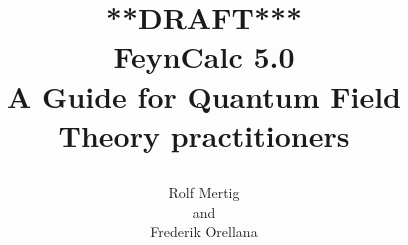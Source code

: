 \documentclass[11pt,a4paper]{report}
\begin{document}
\newcommand{\len}{0pt}
\newcommand{\ind}{\leftskip \len}
\newcommand{\mcode}[1]{
\parbox{0.8\textwidth}{
\setlength{\leftskip}{\len}
\mb{\textbf{ \\ #1 \\ }}
}
}

\renewcommand{\thesection}{\arabic{section}}
\renewcommand{\thechapter}{\arabic{chapter}}

\allsectionsfont{\sffamily}
\sectionfont{\huge \sffamily}


\newcommand{\fname}[1]{
  $\blacksquare$ \ \ {\large\mb{#1}}
  \begin{quote}
}
\newcommand{\fheading}[1]{
\setlength{\leftskip}{4pt}
}
\newcommand{\fusage}[1]{#1\vspace*{10pt}\newline}
\newcommand{\fnotes}[1]{
\setlength{\parindent}{0pt}
\setlength{\parskip}{0pt}
#1}
\newcommand{\ftabtwo}[1]{
\begin{longtable}[H]{p{0.3\textwidth} p{0.54\textwidth
}}
#1
\end{longtable}
}
\newcommand{\ftabthree}[1]{
\renewcommand{\arraystretch}{0.8}
\renewcommand{\arraycolsep}{0}
\begin{longtable}[H]{p{0.23\textwidth} p{0.1\textwidth} p{0.5\textwidth}}
#1
\end{longtable}
}
\newcommand{\seepage}{}
\newcommand{\ffinish}{\end{quote}}


\title{\raggedright \hspace*{1pt} {\bf ***DRAFT***} \\
\vspace*{12pt}
{\LARGE FeynCalc 5.0}\\
\vspace*{40pt}
{\Large A Guide for Quantum Field Theory practitioners}}
\author{\hspace*{-10pt}
\parbox{\textwidth}{\raggedright Rolf Mertig \\
and \\
Frederik Orellana}}
\date{}
{\sffamily
\maketitle
}
\end{document}
